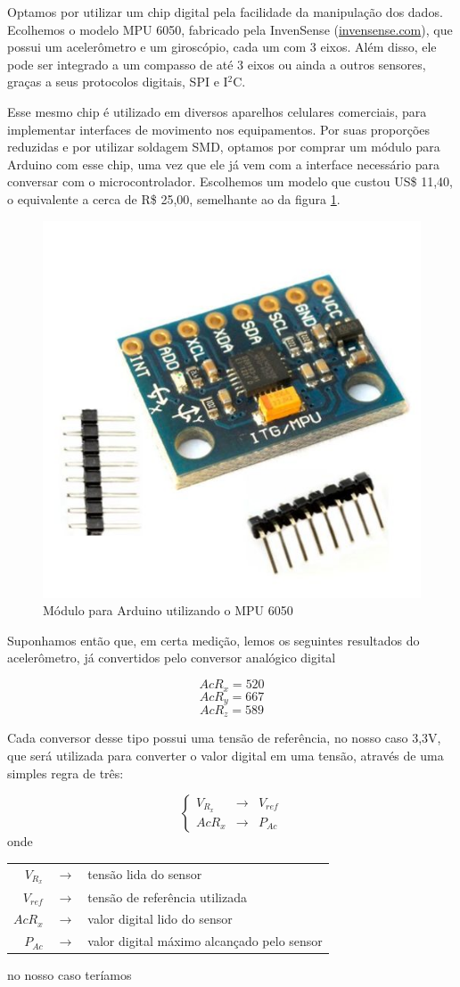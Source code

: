 \documentclass[a4paper,12pt]{article}
\begin{document}
Optamos por utilizar um chip digital pela facilidade da manipulação dos dados. Ecolhemos o modelo MPU 6050, fabricado pela InvenSense (\href{http://www.invensense.com/}{invensense.com}), que possui um acelerômetro e um giroscópio, cada um com 3 eixos. Além disso, ele pode ser integrado a um compasso de até 3 eixos ou ainda a outros sensores, graças a seus protocolos digitais, SPI e I$^2$C.

Esse mesmo chip é utilizado em diversos aparelhos celulares comerciais, para implementar interfaces de movimento nos equipamentos. Por suas proporções reduzidas e por utilizar soldagem SMD, optamos por comprar um módulo para Arduino com esse chip, uma vez que ele já vem com a interface necessário para conversar com o microcontrolador. Escolhemos um modelo que custou US\$ 11,40, o equivalente a cerca de R\$ 25,00, semelhante ao da figura \ref{chip1}.


\begin{figure}[H]
\centering
\includegraphics[width=.4\textwidth]{img/chip.jpg}
\caption{Módulo para Arduino utilizando o MPU 6050}
\label{chip1}
\end{figure}

Suponhamos então que, em certa medição, lemos os seguintes resultados do acelerômetro, já convertidos pelo conversor analógico digital 

$$AcR_x=520$$ 
$$AcR_y=667$$ 
$$AcR_z=589$$

Cada conversor desse tipo possui uma tensão de referência, no nosso caso 3,3V, que será utilizada para converter o valor digital em uma tensão, através de uma simples regra de três: 

$$\left\{\begin{array}{rcl}
V_{R_{x}} &\longrightarrow & V_{ref}\\
AcR_x &\longrightarrow & P_{Ac}
\end{array}\right.
$$
onde 

\begin{center}
\begin{tabular}{rcl}
$V_{R_x}$ & $\longrightarrow$ & tensão lida do sensor \\
$V_{ref}$ & $\longrightarrow$ & tensão de referência utilizada \\
$AcR_x$ & $\longrightarrow$ & valor digital lido do sensor \\
$P_{Ac}$ & $\longrightarrow$ & valor digital máximo alcançado pelo sensor
\end{tabular}
\end{center}
no nosso caso teríamos 
\end{document}
